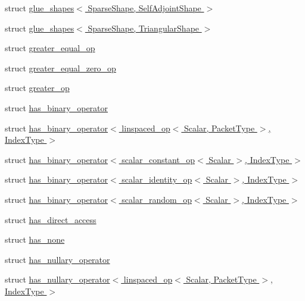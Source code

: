 \begin{DoxyCompactItemize}
struct \hyperlink{struct_eigen_1_1internal_1_1glue__shapes_3_01_sparse_shape_00_01_self_adjoint_shape_01_4}{glue\+\_\+shapes$<$ Sparse\+Shape, Self\+Adjoint\+Shape $>$}
\item 
struct \hyperlink{struct_eigen_1_1internal_1_1glue__shapes_3_01_sparse_shape_00_01_triangular_shape_01_4}{glue\+\_\+shapes$<$ Sparse\+Shape, Triangular\+Shape $>$}
\item 
struct \hyperlink{struct_eigen_1_1internal_1_1greater__equal__op}{greater\+\_\+equal\+\_\+op}
\item 
struct \hyperlink{struct_eigen_1_1internal_1_1greater__equal__zero__op}{greater\+\_\+equal\+\_\+zero\+\_\+op}
\item 
struct \hyperlink{struct_eigen_1_1internal_1_1greater__op}{greater\+\_\+op}
\item 
struct \hyperlink{struct_eigen_1_1internal_1_1has__binary__operator}{has\+\_\+binary\+\_\+operator}
\item 
struct \hyperlink{struct_eigen_1_1internal_1_1has__binary__operator_3_01linspaced__op_3_01_scalar_00_01_packet_type_01_4_00_01_index_type_01_4}{has\+\_\+binary\+\_\+operator$<$ linspaced\+\_\+op$<$ Scalar, Packet\+Type $>$, Index\+Type $>$}
\item 
struct \hyperlink{struct_eigen_1_1internal_1_1has__binary__operator_3_01scalar__constant__op_3_01_scalar_01_4_00_01_index_type_01_4}{has\+\_\+binary\+\_\+operator$<$ scalar\+\_\+constant\+\_\+op$<$ Scalar $>$, Index\+Type $>$}
\item 
struct \hyperlink{struct_eigen_1_1internal_1_1has__binary__operator_3_01scalar__identity__op_3_01_scalar_01_4_00_01_index_type_01_4}{has\+\_\+binary\+\_\+operator$<$ scalar\+\_\+identity\+\_\+op$<$ Scalar $>$, Index\+Type $>$}
\item 
struct \hyperlink{struct_eigen_1_1internal_1_1has__binary__operator_3_01scalar__random__op_3_01_scalar_01_4_00_01_index_type_01_4}{has\+\_\+binary\+\_\+operator$<$ scalar\+\_\+random\+\_\+op$<$ Scalar $>$, Index\+Type $>$}
\item 
struct \hyperlink{struct_eigen_1_1internal_1_1has__direct__access}{has\+\_\+direct\+\_\+access}
\item 
struct \hyperlink{struct_eigen_1_1internal_1_1has__none}{has\+\_\+none}
\item 
struct \hyperlink{struct_eigen_1_1internal_1_1has__nullary__operator}{has\+\_\+nullary\+\_\+operator}
\item 
struct \hyperlink{struct_eigen_1_1internal_1_1has__nullary__operator_3_01linspaced__op_3_01_scalar_00_01_packet_type_01_4_00_01_index_type_01_4}{has\+\_\+nullary\+\_\+operator$<$ linspaced\+\_\+op$<$ Scalar, Packet\+Type $>$, Index\+Type $>$}

\end{DoxyCompactItemize}
